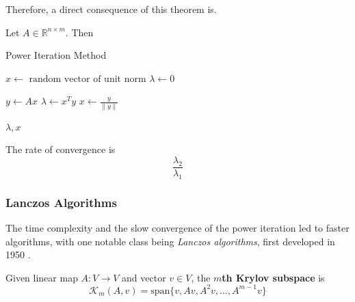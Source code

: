   Therefore, a direct consequence of this theorem is. 

  \begin{algo}
    Let $A \in \mathbb{R}^{n \times m}$. Then 
    \begin{algorithm}[H]
      \caption{Power Iteration Method}
      \label{alg:power_iteration}
      \begin{algorithmic}[1]
            
        
        \State $x \gets \text{ random vector of unit norm}$
        \State $\lambda \gets 0$
        
          \State $y \gets Ax$
          \State $\lambda \gets x^T y$
          \State $x \gets \frac{y}{\|y\|}$
        \EndFor
        
        \State \Return $\lambda, x$
        \EndProcedure
      \end{algorithmic}
    \end{algorithm}
  \end{algo} 

  \begin{corollary}
    The rate of convergence is 
    \begin{equation}
      \frac{\lambda_2}{\lambda_1}
    \end{equation}
  \end{corollary}

\subsubsection{Lanczos Algorithms} 

  The time complexity and the slow convergence of the power iteration led to faster algorithms, with one notable class being \textit{Lanczos algorithms}, first developed in 1950 \cite{1950lanczos}. 

  \begin{definition}
    Given linear map $A: V \to V$ and vector $v \in V$, the \textbf{$m$th Krylov subspace} is 
    \begin{equation}
      \mathcal{K}_m (A, v) = \mathrm{span} \{v, Av, A^2 v, \ldots, A^{m-1} v \}
    \end{equation}
  \end{definition}


